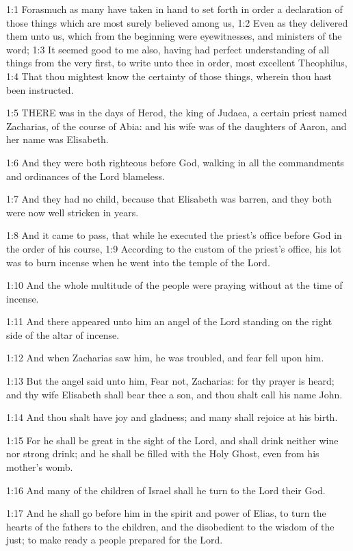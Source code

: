 

1:1 Forasmuch as many have taken in hand to set forth in order a declaration of those things which are most surely believed among us, 1:2 Even as they delivered them unto us, which from the beginning were eyewitnesses, and ministers of the word; 1:3 It seemed good to me also, having had perfect understanding of all things from the very first, to write unto thee in order, most excellent Theophilus, 1:4 That thou mightest know the certainty of those things, wherein thou hast been instructed.

1:5 THERE was in the days of Herod, the king of Judaea, a certain priest named Zacharias, of the course of Abia: and his wife was of the daughters of Aaron, and her name was Elisabeth.

1:6 And they were both righteous before God, walking in all the commandments and ordinances of the Lord blameless.

1:7 And they had no child, because that Elisabeth was barren, and they both were now well stricken in years.

1:8 And it came to pass, that while he executed the priest's office before God in the order of his course, 1:9 According to the custom of the priest's office, his lot was to burn incense when he went into the temple of the Lord.

1:10 And the whole multitude of the people were praying without at the time of incense.

1:11 And there appeared unto him an angel of the Lord standing on the right side of the altar of incense.

1:12 And when Zacharias saw him, he was troubled, and fear fell upon him.

1:13 But the angel said unto him, Fear not, Zacharias: for thy prayer is heard; and thy wife Elisabeth shall bear thee a son, and thou shalt call his name John.

1:14 And thou shalt have joy and gladness; and many shall rejoice at his birth.

1:15 For he shall be great in the sight of the Lord, and shall drink neither wine nor strong drink; and he shall be filled with the Holy Ghost, even from his mother's womb.

1:16 And many of the children of Israel shall he turn to the Lord their God.

1:17 And he shall go before him in the spirit and power of Elias, to turn the hearts of the fathers to the children, and the disobedient to the wisdom of the just; to make ready a people prepared for the Lord.

